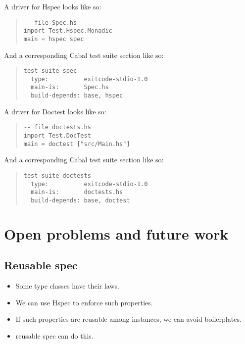 \documentclass[preprint]{sigplanconf}
\begin{document}
A driver for Hspec looks like so:

\begin{quote}
\small
\begin{verbatim}
-- file Spec.hs
import Test.Hspec.Monadic
main = hspec spec
\end{verbatim}
\end{quote}

\noindent And a corresponding Cabal test suite section like so:

\begin{quote}
\small
\begin{verbatim}
test-suite spec
  type:          exitcode-stdio-1.0
  main-is:       Spec.hs
  build-depends: base, hspec
\end{verbatim}
\end{quote}

\noindent A driver for Doctest looks like so:

\begin{quote}
\small
\begin{verbatim}
-- file doctests.hs
import Test.DocTest
main = doctest ["src/Main.hs"]
\end{verbatim}
\end{quote}

\noindent And a corresponding Cabal test suite section like so:

\begin{quote}
\small
\begin{verbatim}
test-suite doctests
  type:          exitcode-stdio-1.0
  main-is:       doctests.hs
  build-depends: base, doctest
\end{verbatim}
\end{quote}

\section{Open problems and future work}

\subsection{Reusable spec}

\begin{itemize}
\item Some type classes have their laws.
\item We can use Hspec to enforce such properties.
\item If such properties are reusable among instances,
we can avoid boilerplates.
\item reusable spec can do this.
\end{itemize}
\end{document}
